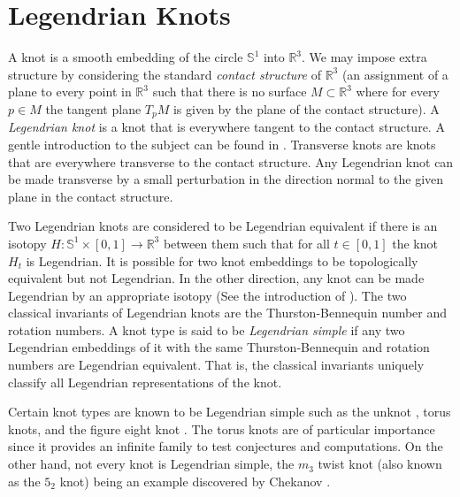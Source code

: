 \documentclass{article}
\theoremstyle{plain}
\begin{document}
	\section{Legendrian Knots}
	    A knot is a smooth embedding of the circle $\mathbb{S}^{1}$ into
	    $\mathbb{R}^{3}$. We may impose extra structure by considering the
	    standard \textit{contact structure} of $\mathbb{R}^{3}$ (an assignment
	    of a plane to every point in $\mathbb{R}^{3}$ such that there is no
	    surface $M\subset\mathbb{R}^{3}$ where for every $p\in{M}$ the tangent
	    plane $T_{p}M$ is given by the plane of the contact structure). A
	    \textit{Legendrian knot} is a knot that is everywhere tangent to the
	    contact structure. A gentle introduction to the subject can be found in
	    \cite{JoshuaMSabloffWhatIsLegendrianKnot}. Transverse knots are knots
	    that are everywhere transverse to the contact structure. Any Legendrian
	    knot can be made transverse by a small perturbation in the direction
	    normal to the given plane in the contact structure.
	    \par\hfill\par
	    Two Legendrian knots are considered to be Legendrian equivalent if
	    there is an isotopy
	    $H:\mathbb{S}^{1}\times[0,1]\rightarrow\mathbb{R}^{3}$ between them
	    such that for all $t\in[0,1]$ the knot $H_{t}$ is Legendrian. It is
	    possible for two knot embeddings to be topologically equivalent but not
	    Legendrian. In the other direction, any knot can be made Legendrian by
	    an appropriate isotopy (See the introduction of
	    \cite{VeraVertessiTransNonSimpleKnots}). The two classical invariants
	    of Legendrian knots are the Thurston-Bennequin number and rotation
	    numbers. A knot type is said to be \textit{Legendrian simple} if
	    any two Legendrian embeddings of it with the same Thurston-Bennequin
	    and rotation numbers are Legendrian equivalent. That is, the classical
	    invariants uniquely classify all Legendrian representations of the
	    knot.
	    \par\hfill\par
	    Certain knot types are known to be Legendrian simple such as the unknot
	    \cite{EliashbergFraserClassificationTopTrivialLegKnots}, torus knots,
	    and the figure eight knot \cite{EtnyreHondaContactTopologyI}. The torus
	    knots are of particular importance since it provides an infinite
	    family to test conjectures and computations. On the other hand,
	    not every knot is Legendrian simple, the $m_{3}$ twist knot (also
	    known as the $5_{2}$ knot) being an example discovered by Chekanov
	    \cite{ChekanovDifAlgOfLegLinks}.
\end{document}
